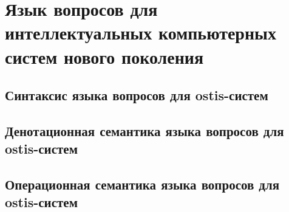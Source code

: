 \chapter{Язык вопросов для интеллектуальных компьютерных систем нового поколения}
\label{chapter_requests}


\section{Синтаксис языка вопросов для ostis-систем}
\section{Денотационная семантика языка вопросов для ostis-систем}
\section{Операционная семантика языка вопросов для ostis-систем}

%